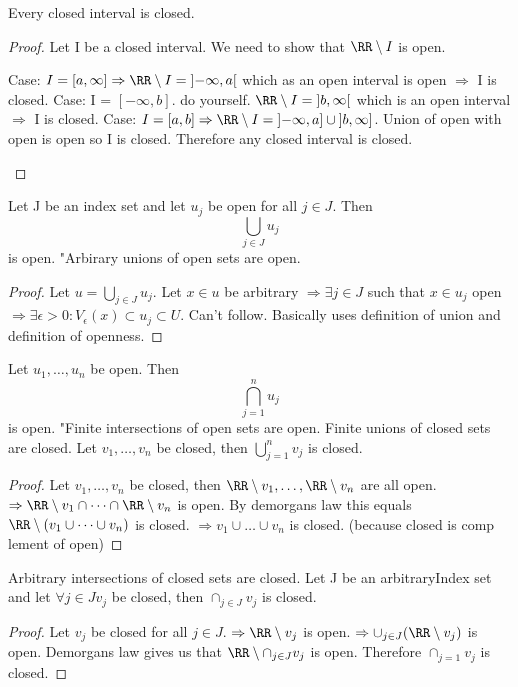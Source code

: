 \documentclass[11pt]{scrartcl}
\begin{document}
\begin{theorem}
  Every closed interval is closed.
  \begin{proof}
    Let I be a closed interval. We need to show that $\RR \setminus I$ is open.
    \begin{enumerate}
      \ii
      Case: $I = [a, \infty] \Rightarrow \RR \setminus I = \left] -\infty, a\right[$ which as an open interval is open $\Rightarrow$ I is closed.
      \ii
      Case: I = $\left[-\infty, b\right]$. do yourself. $\RR \setminus I = \left]b, \infty\right[$ which is an open interval $\Rightarrow$ I is closed.
      \ii
      Case: $I = \left[a, b\right] \Rightarrow \RR \setminus I = \left]-\infty, a\right] \cup \left]b, \infty\right]$. Union of open with open is open so I is closed. Therefore any closed interval is closed.
    \end{enumerate}
  \end{proof}
\end{theorem}

\begin{theorem}
  \begin{enumerate}[label=\alph*.]
    \ii[]
    \ii
    Let J be an index set and let $u_j$ be open for all $j \in J$. Then
    $$\bigcup_{j \in J}u_j$$ is open.
    "Arbirary unions of open sets are open.
    \begin{proof}
      Let $u = \bigcup_{j \in J}u_j$. Let $x \in u$ be arbitrary $\Rightarrow \exists j \in J$ such that $x \in u_j$ open $\Rightarrow \exists \epsilon > 0: V_\epsilon(x) \subset u_j \subset U$. Can't follow. Basically uses definition of union and definition of openness.
    \end{proof}
    \ii
    Let $u_1, \dots, u_n$ be open. Then 
    $$ \bigcap_{j = 1}^n u_j$$ is open. "Finite intersections of open sets are open.
    \ii
    Finite unions of closed sets are closed.
    Let $v_1, \dots, v_n$ be closed, then $\bigcup_{j = 1}^{n}v_j$ is closed.
    \begin{proof}
      Let $v_1, \dots, v_n$ be closed, then $\RR \setminus v_1, \dots, \RR \setminus v_n$ are all open.
      $\Rightarrow \RR \setminus v_1 \cap \dots \cap \RR \setminus v_n$ is open. By demorgans law this equals $\RR \setminus (v_1 \cup \dots \cup v_n)$ is closed.
      $\Rightarrow v_1 \cup \dots \cup v_n$ is closed. (because closed is comp lement of open)
    \end{proof}
    \ii
    Arbitrary intersections of closed sets are closed.
    Let J be an arbitraryIndex set and let $\forall j \in J v_j$ be closed, then $\cap_{j \in J}v_j$ is closed.
    \begin{proof}
      Let $v_j$ be closed for all $j \in J$.
      $\Rightarrow \RR \setminus v_j$ is open.
      $\Rightarrow \cup_{j \in J}(\RR \setminus v_j)$ is open.
      Demorgans law gives us that $\RR \setminus \cap_{j \in J} v_j$ is open.
      Therefore $\cap_{j = 1}v_j$ is closed.
    \end{proof}
  \end{enumerate}
\end{theorem}
\end{document}
